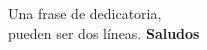 \documentclass[letterpaper,oneside]{book} %
\begin{document}
	
\templatePortrait

\templatePagecfg

\begin{dedicatoria}
	Una frase de dedicatoria, \\
	pueden ser dos líneas. \newp
	\textbf{Saludos}
\end{dedicatoria}

\begin{agradecimientos}
	\lipsum[1]
\end{agradecimientos}

\templateIndex

\begin{resumen}
	\lipsum[1]
\end{resumen}

\templateFinalcfg



\end{document}
